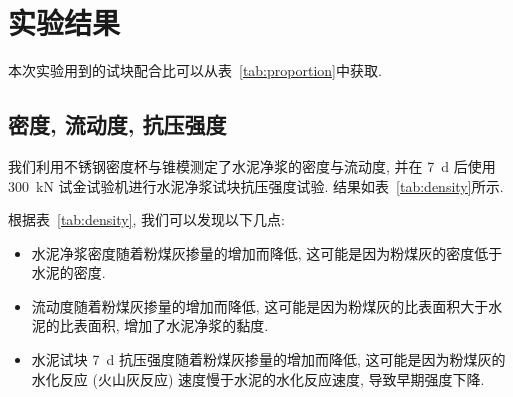 
\section{实验结果}

本次实验用到的试块配合比可以从表~\ref{tab:proportion}中获取. 

\subsection{密度, 流动度, 抗压强度}

我们利用不锈钢密度杯与锥模测定了水泥净浆的密度与流动度, 并在 \SI{7}{\day} 后使用 \SI{300}{\kilo\newton} 试金试验机进行水泥净浆试块抗压强度试验. 结果如表~\ref{tab:density}所示. 

\begin{table}[!t]
  \centering
  \caption{水泥净浆密度, 流动度与水泥试块 \SI{7}{\day} 平均抗压强度实验结果}
  \label{tab:density}
\end{table}

根据表~\ref{tab:density}, 我们可以发现以下几点:
\begin{itemize}
  \item 水泥净浆密度随着粉煤灰掺量的增加而降低, 这可能是因为粉煤灰的密度低于水泥的密度.
  \item 流动度随着粉煤灰掺量的增加而降低, 这可能是因为粉煤灰的比表面积大于水泥的比表面积, 增加了水泥净浆的黏度.
  \item 水泥试块 \SI{7}{\day} 抗压强度随着粉煤灰掺量的增加而降低, 这可能是因为粉煤灰的水化反应 (火山灰反应) 速度慢于水泥的水化反应速度, 导致早期强度下降.
\end{itemize}


